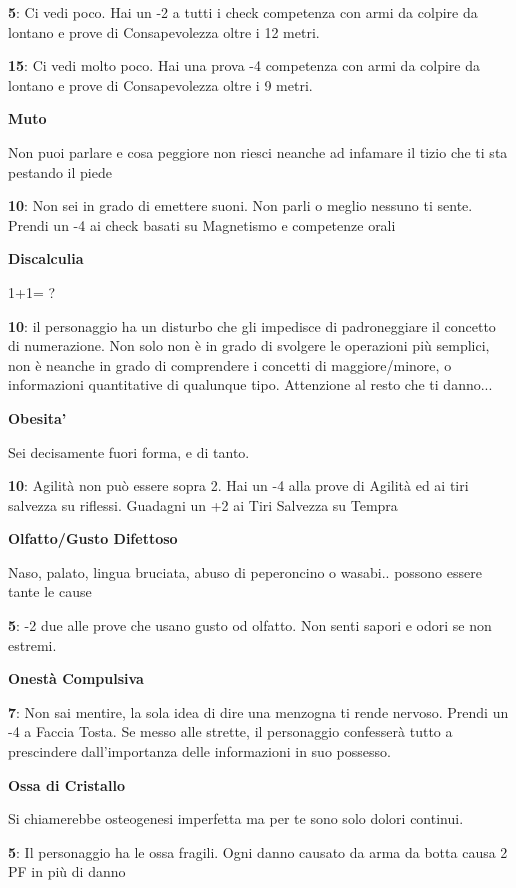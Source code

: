 \documentclass[a4paper,11pt,twoside,openany]{book}
\begin{document}
\textbf{5}: Ci vedi poco. Hai un -2 a tutti i check competenza con armi da colpire da lontano e prove di Consapevolezza oltre i 12 metri.

\textbf{15}: Ci vedi molto poco. Hai una prova -4 competenza con armi da colpire da lontano e prove di Consapevolezza oltre i 9 metri.

\textbf{Muto}

Non puoi parlare e cosa peggiore non riesci neanche ad infamare il
tizio che ti sta pestando il piede

\textbf{10}: Non sei in grado di emettere suoni. Non parli o meglio nessuno ti sente. Prendi un -4 ai check basati su Magnetismo e competenze orali

\textbf{Discalculia}

1+1= ?

\textbf{10}: il personaggio ha un disturbo che gli impedisce di padroneggiare il concetto di numerazione. Non solo non è in grado di svolgere le operazioni più semplici, non è neanche in grado di comprendere i concetti di maggiore/minore, o informazioni quantitative di qualunque tipo.
Attenzione al resto che ti danno...

\textbf{Obesita'}

Sei decisamente fuori forma, e di tanto.

\textbf{10}: Agilità non può essere sopra 2. Hai un -4 alla prove di Agilità ed ai tiri salvezza su riflessi. Guadagni un +2 ai Tiri Salvezza su Tempra

\textbf{Olfatto/Gusto Difettoso}

Naso, palato, lingua bruciata, abuso di peperoncino o wasabi.. possono essere tante le cause

\textbf{5}: -2 due alle prove che usano gusto od olfatto. Non senti sapori e odori se non estremi.

\textbf{Onestà Compulsiva}

\textbf{7}: Non sai mentire, la sola idea di dire una menzogna ti rende nervoso. Prendi un -4 a Faccia Tosta. Se messo alle strette, il personaggio confesserà tutto a prescindere dall'importanza delle informazioni in suo possesso.

\textbf{Ossa di Cristallo}

Si chiamerebbe osteogenesi imperfetta ma per te sono solo dolori continui.

\textbf{5}: Il personaggio ha le ossa fragili. Ogni danno causato da arma da botta causa 2 PF in più di danno
\end{document}
